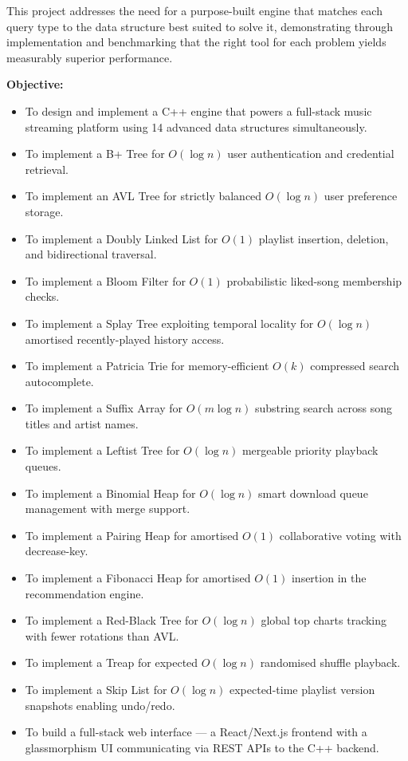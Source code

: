 \documentclass[12pt, a4paper]{article}
\begin{document}
This project addresses the need for a purpose-built engine that matches each query type to the data structure best suited to solve it, demonstrating through implementation and benchmarking that the right tool for each problem yields measurably superior performance.

\textbf{Objective:}
\begin{itemize}[leftmargin=2em, itemsep=2pt]
    \item To design and implement a C++ engine that powers a full-stack music streaming platform using 14 advanced data structures simultaneously.
    \item To implement a B+ Tree for $O(\log n)$ user authentication and credential retrieval.
    \item To implement an AVL Tree for strictly balanced $O(\log n)$ user preference storage.
    \item To implement a Doubly Linked List for $O(1)$ playlist insertion, deletion, and bidirectional traversal.
    \item To implement a Bloom Filter for $O(1)$ probabilistic liked-song membership checks.
    \item To implement a Splay Tree exploiting temporal locality for $O(\log n)$ amortised recently-played history access.
    \item To implement a Patricia Trie for memory-efficient $O(k)$ compressed search autocomplete.
    \item To implement a Suffix Array for $O(m \log n)$ substring search across song titles and artist names.
    \item To implement a Leftist Tree for $O(\log n)$ mergeable priority playback queues.
    \item To implement a Binomial Heap for $O(\log n)$ smart download queue management with merge support.
    \item To implement a Pairing Heap for amortised $O(1)$ collaborative voting with decrease-key.
    \item To implement a Fibonacci Heap for amortised $O(1)$ insertion in the recommendation engine.
    \item To implement a Red-Black Tree for $O(\log n)$ global top charts tracking with fewer rotations than AVL.
    \item To implement a Treap for expected $O(\log n)$ randomised shuffle playback.
    \item To implement a Skip List for $O(\log n)$ expected-time playlist version snapshots enabling undo/redo.
    \item To build a full-stack web interface --- a React/Next.js frontend with a glassmorphism UI communicating via REST APIs to the C++ backend.
\end{itemize}
\end{document}
